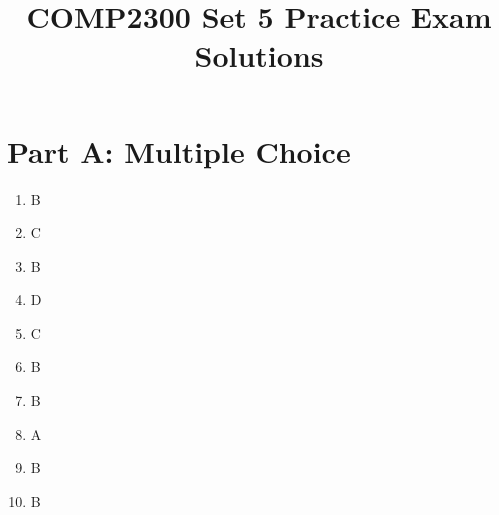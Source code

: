 \documentclass[11pt]{article}
\title{COMP2300 Set 5 Practice Exam Solutions}
\author{}
\date{}
\begin{document}
\maketitle

\section*{Part A: Multiple Choice}
\begin{enumerate}[label=\textbf{A\arabic*.}]
  \item B
  \item C
  \item B
  \item D
  \item C
  \item B
  \item B
  \item A
  \item B
  \item B
\end{enumerate}
\end{document}
